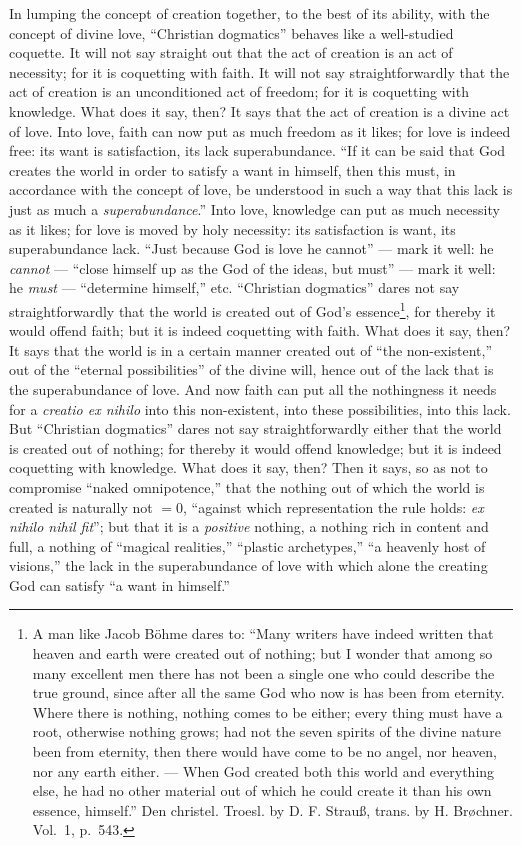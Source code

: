 \documentclass[12pt]{book}
\newcommand{\opage}[1]{\marginnote{\footnotesize\textit{[#1]}}}
\begin{document}
In lumping the concept of creation together, to the best of its ability, with the concept of divine love, ``Christian dogmatics'' behaves like a well-studied coquette. It will not say straight out that the act of creation is an act of necessity; for it is coquetting with faith. It will not say straightforwardly that the act of creation is an unconditioned act of freedom; for it is coquetting with knowledge. What does it say, then? It says that the act of creation is a divine act of love. Into love, faith can now put as much freedom as it likes; for love is indeed free: its want is satisfaction, its lack superabundance. ``If it can be said that God creates the world in order to satisfy a want in himself, then this must, in accordance with the concept of love, be understood in such a way that this lack is just as much a \emph{superabundance}.'' Into love, knowledge can put as much necessity as it likes; for love is moved by holy necessity: its satisfaction is want, its superabundance lack. ``Just because God is love he cannot'' --- mark it well: he \emph{cannot} --- ``close himself up as the God of the ideas, but must'' --- mark it well: he \emph{must} --- ``determine himself,'' etc. ``Christian dogmatics'' dares not say straightforwardly that the world is created out of God's essence\footnote{A man like Jacob Böhme dares to: ``Many writers have indeed written that heaven and earth were created out of nothing; but I wonder that among so many excellent men there has not been a single one who could describe the true ground, since after all the same God who now is has been from eternity. Where there is nothing, nothing comes to be either; every thing must have a root, otherwise nothing grows; had not the seven spirits of the divine nature been from eternity, then there would have come to be no angel, nor heaven, nor any earth either. --- When God created both this world and everything else, he had no other material out of which he could create it than his own essence, himself.'' Den christel. Troesl. by D. F. Strauß, trans. by H. Brøchner. Vol.~1, p.~543.}, for thereby it would
\opage{99}\setcounter{footnote}{0}%
offend faith; but it is indeed coquetting with faith. What does it say, then? It says that the world is in a certain manner created out of ``the non-existent,'' out of the ``eternal possibilities'' of the divine will, hence out of the lack that is the superabundance of love. And now faith can put all the nothingness it needs for a \textit{creatio ex nihilo} into this non-existent, into these possibilities, into this lack. But ``Christian dogmatics'' dares not say straightforwardly either that the world is created out of nothing; for thereby it would offend knowledge; but it is indeed coquetting with knowledge. What does it say, then? Then it says, so as not to compromise ``naked omnipotence,'' that the nothing out of which the world is created is naturally not $=0$, ``against which representation the rule holds: \textit{ex nihilo nihil fit}''; but that it is a \emph{positive} nothing, a nothing rich in content and full, a nothing of ``magical realities,'' ``plastic archetypes,'' ``a heavenly host of visions,'' the lack in the superabundance of love with which alone the creating God can satisfy ``a want in himself.''
\end{document}
